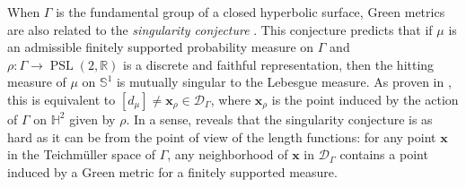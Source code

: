 \documentclass[twoside]{amsart}
\newtheorem{corollary}[theorem]{Corollary}
\theoremstyle{definition}
\numberwithin{equation}{section}
\numberwithin{theorem}{section}
\newcommand{\mbb}[1]{\mathbb{#1}}
\newcommand{\Hy}{\mathbb{H}}
\newcommand{\R}{\mathbb{R}}
\newcommand{\calD}{\mathcal{D}}
\newcommand{\scrD}{\mathscr{D}}
\newcommand{\G}{\Gamma}
\DeclareMathOperator{\PSL}{PSL}
\DeclareMathOperator{\Dil}{Dil}
\newcommand{\ra}{\rightarrow}
\newcommand{\vx}{\mathbf{x}}
\begin{document}



When $\G$ is the fundamental group of a closed hyperbolic surface, Green metrics are also related to the \emph{singularity conjecture} \cite{kaimanovich-leprince}. This conjecture predicts that if $\mu$ is an admissible finitely supported probability measure on $\G$ and $\rho:\G \ra \PSL(2,\R)$ is a discrete and faithful representation, then the hitting measure of $\mu$ on $\mbb{S}^1$ is mutually singular to the Lebesgue measure. As proven in \cite{BHM.harmonic}, this is equivalent to $[d_\mu]\neq \vx_{\rho}\in \scrD_\G$, where $\vx_\rho$ is the point induced by the action of $\G$ on $\Hy^2$ given by $\rho$. In a sense,  reveals that the singularity conjecture is as hard as it can be from the point of view of the length functions: for any point $\vx$ in the Teichm\"uller space of $\G$, any neighborhood of $\vx$ in $\scrD_\G$ contains a point induced by a Green metric for a finitely supported measure.
\end{document}
